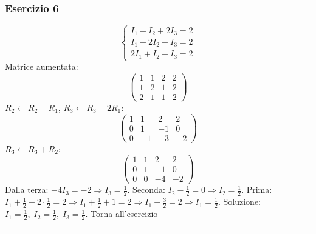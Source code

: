 \subsubsection*{\hyperref[ex:6]{Esercizio 6}}
\[
\begin{cases}
I_1 + I_2 + 2I_3 = 2 \\
I_1 + 2I_2 + I_3 = 2 \\
2I_1 + I_2 + I_3 = 2
\end{cases}
\]
Matrice aumentata:
\[
\left(\begin{array}{ccc|c}
1 & 1 & 2 & 2 \\
1 & 2 & 1 & 2 \\
2 & 1 & 1 & 2
\end{array}\right)
\]
\(R_2 \leftarrow R_2 - R_1\), \(R_3 \leftarrow R_3 - 2R_1\):
\[
\left(\begin{array}{ccc|c}
1 & 1 & 2 & 2 \\
0 & 1 & -1 & 0 \\
0 & -1 & -3 & -2
\end{array}\right)
\]
\(R_3 \leftarrow R_3 + R_2\):
\[
\left(\begin{array}{ccc|c}
1 & 1 & 2 & 2 \\
0 & 1 & -1 & 0 \\
0 & 0 & -4 & -2
\end{array}\right)
\]
Dalla terza: \(-4I_3 = -2 \Rightarrow I_3 = \frac{1}{2}\).
Seconda: \(I_2 - \frac{1}{2} = 0 \Rightarrow I_2 = \frac{1}{2}\).
Prima: \(I_1 + \frac{1}{2} + 2\cdot\frac{1}{2} = 2 \Rightarrow I_1 + \frac{1}{2} + 1 = 2 \Rightarrow I_1 + \frac{3}{2} = 2 \Rightarrow I_1 = \frac{1}{2}\).
Soluzione: \(\displaystyle I_1 = \frac{1}{2},\; I_2 = \frac{1}{2},\; I_3 = \frac{1}{2}\). \hfill \hyperlink{ex:6}{Torna all'esercizio}\\
\hrule

